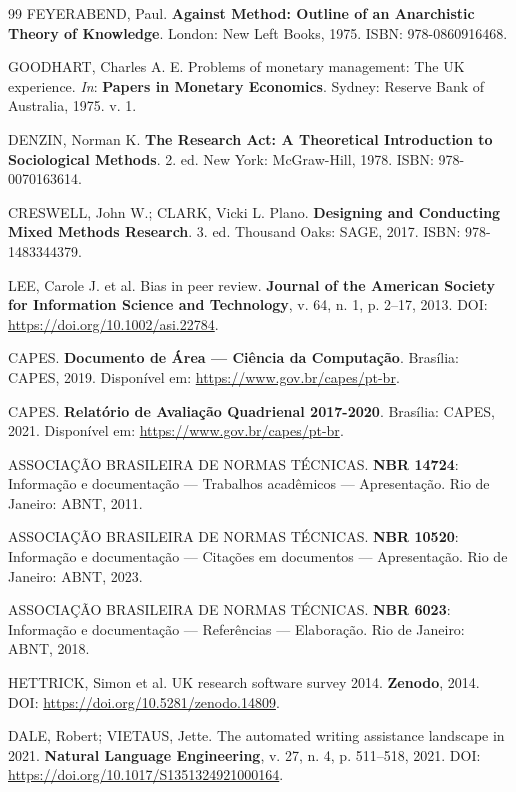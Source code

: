 \begin{thebibliography}{99}
FEYERABEND, Paul. \textbf{Against Method: Outline of an Anarchistic Theory of Knowledge}. London: New Left Books, 1975. ISBN: 978-0860916468.

GOODHART, Charles A. E. Problems of monetary management: The UK experience. \textit{In}: \textbf{Papers in Monetary Economics}. Sydney: Reserve Bank of Australia, 1975. v. 1.

DENZIN, Norman K. \textbf{The Research Act: A Theoretical Introduction to Sociological Methods}. 2. ed. New York: McGraw-Hill, 1978. ISBN: 978-0070163614.

CRESWELL, John W.; CLARK, Vicki L. Plano. \textbf{Designing and Conducting Mixed Methods Research}. 3. ed. Thousand Oaks: SAGE, 2017. ISBN: 978-1483344379.

LEE, Carole J. et al. Bias in peer review. \textbf{Journal of the American Society for Information Science and Technology}, v. 64, n. 1, p. 2--17, 2013. DOI: \url{https://doi.org/10.1002/asi.22784}.

CAPES. \textbf{Documento de Área --- Ciência da Computação}. Brasília: CAPES, 2019. Disponível em: \url{https://www.gov.br/capes/pt-br}.

CAPES. \textbf{Relatório de Avaliação Quadrienal 2017-2020}. Brasília: CAPES, 2021. Disponível em: \url{https://www.gov.br/capes/pt-br}.

ASSOCIAÇÃO BRASILEIRA DE NORMAS TÉCNICAS. \textbf{NBR 14724}: Informação e documentação --- Trabalhos acadêmicos --- Apresentação. Rio de Janeiro: ABNT, 2011.

ASSOCIAÇÃO BRASILEIRA DE NORMAS TÉCNICAS. \textbf{NBR 10520}: Informação e documentação --- Citações em documentos --- Apresentação. Rio de Janeiro: ABNT, 2023.

ASSOCIAÇÃO BRASILEIRA DE NORMAS TÉCNICAS. \textbf{NBR 6023}: Informação e documentação --- Referências --- Elaboração. Rio de Janeiro: ABNT, 2018.

HETTRICK, Simon et al. UK research software survey 2014. \textbf{Zenodo}, 2014. DOI: \url{https://doi.org/10.5281/zenodo.14809}.

DALE, Robert; VIETAUS, Jette. The automated writing assistance landscape in 2021. \textbf{Natural Language Engineering}, v. 27, n. 4, p. 511--518, 2021. DOI: \url{https://doi.org/10.1017/S1351324921000164}.


\end{thebibliography}
